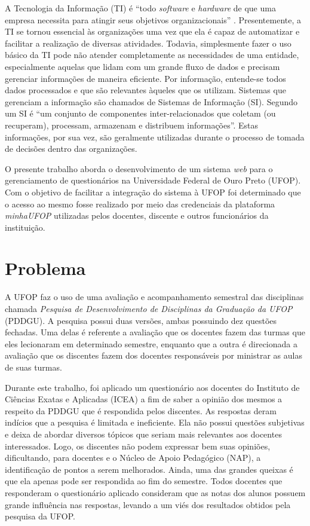 \documentclass[
  12pt,       %
  openright,      %
  oneside,      %
  a4paper,      %
  english,      %
  french,        %
  spanish,     %
  brazil        %
  ]{abntex2-decsi}
\begin{document}
A Tecnologia da Informação (TI) é ``todo \textit{software} e \textit{hardware} de que uma empresa necessita para atingir seus objetivos organizacionais'' \cite[p. 12]{laudon:2010}. Presentemente, a TI se tornou essencial às organizações uma vez que ela é capaz de automatizar e facilitar a realização de diversas atividades. Todavia, simplesmente fazer o uso básico da TI pode não atender completamente as necessidades de uma entidade, especialmente aquelas que lidam com um grande fluxo de dados e precisam gerenciar informações de maneira eficiente. Por informação, entende-se todos dados processados e que são relevantes àqueles que os utilizam. Sistemas que gerenciam a informação são chamados de Sistemas de Informação (SI). Segundo  um SI é ``um conjunto de componentes inter-relacionados que coletam (ou recuperam), processam, armazenam e distribuem informações''. Estas informações, por sua vez, são geralmente utilizadas durante o processo de tomada de decisões dentro das organizações.

O presente trabalho aborda o desenvolvimento de um sistema \textit{web} para o gerenciamento de questionários na Universidade Federal de Ouro Preto (UFOP). Com o objetivo de facilitar a integração do sistema à UFOP foi determinado que o acesso ao mesmo fosse realizado por meio das credenciais da plataforma \textit{minhaUFOP} utilizadas pelos docentes, discente e outros funcionários da instituição. 

    \section{Problema}

    A UFOP faz o uso de uma avaliação e acompanhamento semestral das disciplinas chamada \textit{Pesquisa de Desenvolvimento de Disciplinas da Graduação da UFOP} (PDDGU). A pesquisa possui duas versões, ambas possuindo dez questões fechadas. Uma delas é referente a avaliação que os docentes fazem das turmas que eles lecionaram em determinado semestre, enquanto que a outra é direcionada a avaliação que os discentes fazem dos docentes responsáveis por ministrar as aulas de suas turmas.

    Durante este trabalho, foi aplicado um questionário aos docentes do Instituto de Ciências Exatas e Aplicadas (ICEA) a fim de saber a opinião dos mesmos a respeito da PDDGU que é respondida pelos discentes. As respostas deram indícios que a pesquisa é limitada e ineficiente. Ela não possui questões subjetivas e deixa de abordar diversos tópicos que seriam mais relevantes aos docentes interessados. Logo, os discentes não podem expressar bem suas opiniões, dificultando, para docentes e o Núcleo de Apoio Pedagógico (NAP), a identificação de pontos a serem melhorados. Ainda, uma das grandes queixas é que ela apenas pode ser respondida ao fim do semestre. Todos docentes que responderam o questionário aplicado consideram que as notas dos alunos possuem grande influência nas respostas, levando a um viés dos resultados obtidos pela pesquisa da UFOP. 
\end{document}
